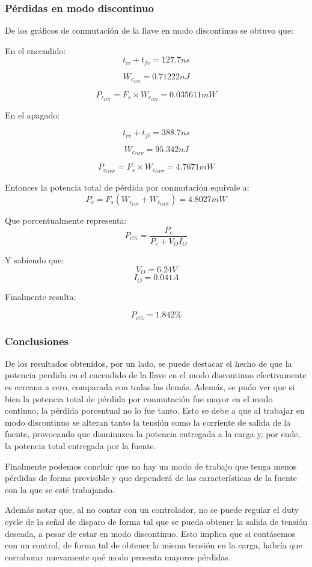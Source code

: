 \documentclass[e4_tp1_main.tex]{subfiles}
\begin{document}
	
	
	\subsubsection{Pérdidas en modo discontinuo}
	De los gráficos de conmutación de la llave en modo discontinuo se obtuvo que:
	
	En el encendido:
	\[t_{ri}+t_{fv}=127.7ns\]
	
	
	
	\[W_{c_{ON}}=0.71222nJ\]
	
	
	
	\[P_{c_{ON}}=F_s\times W_{c_{ON}}=0.035611mW\]
	
	
	En el apagado:
	
	\[t_{rv}+t_{fi}=388.7ns\]
	
	
	
	\[W_{c_{OFF}}=95.342nJ\]
	
	\[P_{c_{OFF}}=F_s\times W_{c_{OFF}}=4.7671mW\]
	
	Entonces la potencia total de pérdida por conmutación equivale a:
	\[P_c=F_s(W_{c_{ON}}+W_{c_{OFF}})=4.8027mW\]
	
	Que porcentualmente representa:
	\[P_{c\%}=\frac{P_c}{P_c+V_OI_O}\]
	
	Y sabiendo que:
	\[V_O=6.24V\]
	\[I_O=0.041A\]
	
	Finalmente resulta:
	
	\[P_{c\%}=1.842\%\]
	
	\subsubsection{Conclusiones}
	De los resultados obtenidos, por un lado, se puede destacar el hecho de que la potencia perdida en el encendido de la llave en el modo discontinuo  efectivamente es cercana a cero, comparada con todas las demás. Además, se pudo ver que si bien la potencia total de pérdida por conmutación fue mayor en el modo continuo, la pérdida porcentual no lo fue tanto. Esto se debe a que al trabajar en modo discontinuo se alteran tanto la tensión como la corriente de salida de la fuente, provocando que disminuzca la potencia entregada a la carga y, por ende, la potencia total entregada por la fuente. 
	
	Finalmente podemos concluir que no hay un modo de trabajo que tenga menos pérdidas de forma previsible y que dependerá de las características de la fuente con la que se esté trabajando. 
	
	Además notar que, al no contar con un controlador, no se puede regular el duty cycle de la señal de disparo de forma tal que se pueda obtener la salida de tensión deseada, a pesar de estar en modo discontinuo. Esto implica que si contásemos con un control, de forma tal de obtener la misma tensión en la carga, habría que corroborar nuevamente qué modo presenta mayores pérdidas.
	
\end{document}
